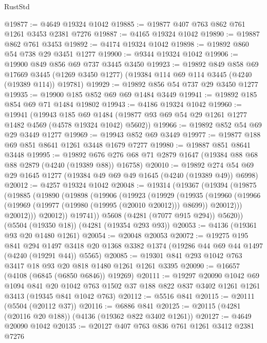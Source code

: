 \begin{lexlean}{RustStd}
\begin{coremodule}
@19877 := @4649 @19324 @1042
@19885 := @19877 @407 @763 @862 @761 @1261 @3453 @2381 @7276
@19887 := @4165 @19324 @1042
@19890 := @19887 @862 @761 @3453
@19892 := @4174 @19324 @1042
@19898 := @19892 @860 @54 @738 @29 @3451 @1277
@19900 := @9344 @19324 @1042
@19906 := @19900 @849 @856 @69 @737 @3445 @3450
@19923 := @19892
    @849
    @858
    @69
    @17669
    @3445
    (@1269 @3450 @1277)
    (@19384 @114 @69 @114 @3445 (@4240 (@19389 @114)) @19781)
@19929 := @19892 @856 @54 @737 @29 @3450 @1277
@19935 := @19900 @185 @852 @69 @69 @1484 @3449
@19941 := @19892 @185 @854 @69 @71 @1484 @19802
@19943 := @4186 @19324 @1042
@19960 := @19941
    (@19943
      @185
      @69
      @1484
      (@19877 @93 @69 @54 @29 @1261 @1277 @1482 @4569 (@4578 @19324 @1042) @5602))
@19966 := @19892 @852 @54 @69 @29 @3449 @1277
@19969 := @19943 @852 @69 @3449
@19977 := @19877 @188 @69 @851 @8641 @1261 @3448 @1679 @7277
@19980 := @19887 @851 @8641 @3448
@19995 := @19892
    @676
    @276
    @68
    @71
    @2879
    @1647
    (@19384 @88 @68 @88 @2879 (@4240 (@19389 @88)) @16758)
@20010 := @19892 @274 @54 @69 @29 @1645 @1277 (@19384 @49 @69 @49 @1645 (@4240 (@19389 @49)) @6998)
@20012 := @4257 @19324 @1042
@20048 := @19314
    (@19367
      (@19394
        (@19875
          (@19885
            (@19890
              (@19898
                (@19906
                  (@19923
                    (@19929
                      (@19935
                        (@19960
                          (@19966
                            (@19969 (@19977 (@19980 (@19995 (@20010 @20012))) @8699))
                            @20012)))
                      @20012)))
                @20012))
            @19741))
        @5608
        (@4281 (@7077 @915 @294))
        @5620))
    (@5504 (@19350 @18))
    (@4281 (@19354 @293 @93))
@20053 := @4136 (@19361 @93 @20 @1480 @1261)
@20054 := @20048 @20053
@20072 := @19275
    @195
    @841
    @294
    @1497
    @3418
    @20
    @1368
    @3382
    @1374
    (@19286 @44 @69 @44 @1497 (@4240 (@19291 @44)) @5565)
@20085 := @19301 @841 @293 @1042 @763 @3417 @18 @93 @20 @818 @1480 @1261 @1261 @3395
@20090 := @16657 (@4108 (@6845 (@6850 @6846)) @19269)
@20111 := @19297
    @20090
    @1042
    @69
    @1094
    @841
    @20
    @1042
    @763
    @1502
    @37
    @188
    @822
    @837
    @3402
    @1261
    @1261
    @3413
    (@19345 @841 @1042 @763)
@20112 := @5516 @841
@20115 := @20111 (@5504 (@20112 @37))
@20116 := @6886 @841
@20125 := @20115 (@4281 (@20116 @20 @188)) (@4136 (@19362 @822 @3402 @1261))
@20127 := @4649 @20090 @1042
@20135 := @20127 @407 @763 @836 @761 @1261 @3412 @2381 @7276

\end{coremodule}
\end{lexlean}
